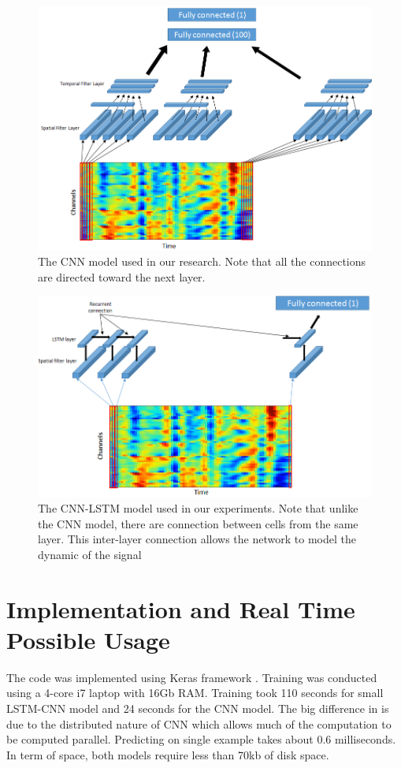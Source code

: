 \documentclass[
12pt, %
english, %
doublespacing, %
headsepline, %
]{MastersDoctoralThesis} %
\begin{document}
\begin{figure}
	\centering
	\includegraphics[width=1.1\linewidth]{Figures/CNN_detailed}
	\caption{The CNN model used in our research. Note that all the connections are directed toward the next layer.}
	\label{fig:CNN_detailed}
\end{figure}


\begin{figure}
	\centering
	\includegraphics[width=1.1\linewidth]{Figures/LSTM_CNN_detailed}
	\caption{The CNN-LSTM model used in our experiments. Note that unlike the CNN model, there are connection between cells from the same layer. This inter-layer connection allows the network to model the dynamic of the signal}
	\label{fig:LSTM_CNN_detailed}
\end{figure}

\section{Implementation and Real Time Possible Usage}
The code was implemented using Keras framework \cite{chollet2015keras}. Training was conducted using a 4-core i7 laptop with 16Gb RAM. Training took 110 seconds for small LSTM-CNN model and 24 seconds for the CNN model. The big difference in is due to the distributed nature of  CNN which allows much of the computation to be computed parallel. Predicting on single example takes about 0.6 milliseconds. In term of space, both models require less than 70kb of disk space.
\end{document}
